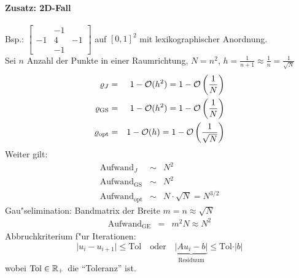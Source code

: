 \documentclass{scrartcl}
\begin{document}
\paragraph*{Zusatz: 2D-Fall}
Bsp.: $\left[ \begin{smallmatrix} & -1 \\ -1 & 4 & -1 \\ & -1 \end{smallmatrix} \right]$ auf $[0,1]^2$ mit lexikographischer Anordnung. \\
Sei $n$ Anzahl der Punkte in einer Raumrichtung, $N = n^2$, $h = \frac{1}{n+1} \approx \frac1n = \frac{1}{\sqrt{N}}$
\begin{eqnarray*}
\varrho_J & = & 1 - \mathcal{O}(h^2) = 1 - \mathcal{O} \left( \frac1N \right) \\
\varrho_\mathrm{GS} & = & 1 - \mathcal{O} (h^2) = 1 - \mathcal{O} \left( \frac 1N \right) \\
\varrho_\mathrm{opt} & = & 1 - \mathcal{O}(h) = 1 - \mathcal{O} \left( \frac{1}{\sqrt{N}} \right)
\end{eqnarray*}
Weiter gilt:
\begin{eqnarray*}
\mathrm{Aufwand}_J & \sim & N^2 \\
\mathrm{Aufwand}_\mathrm{GS} & \sim & N^2 \\
\mathrm{Aufwand}_\mathrm{opt} & \sim & N \cdot \sqrt{N} = N^{3/2}
\end{eqnarray*}
Gau"selimination: Bandmatrix der Breite $m = n \approx \sqrt{N}$ 
\begin{eqnarray*}
\mathrm{Aufwand}_\mathrm{GE} & = & m^2 N \approx N^2
\end{eqnarray*}
Abbruchkriterium f"ur Iterationen:
$$ \vert u_i - u_{i+1} \vert \leq \mathrm{Tol} \quad \mathrm{oder} \quad \underbrace{ \vert Au_i - b \vert }_{\mathrm{Residuum}} \leq \mathrm{Tol} \cdot \vert b \vert$$
wobei $\mathrm{Tol} \in \mathbb{R}_+$ die "`Toleranz"' ist.
\end{document}
